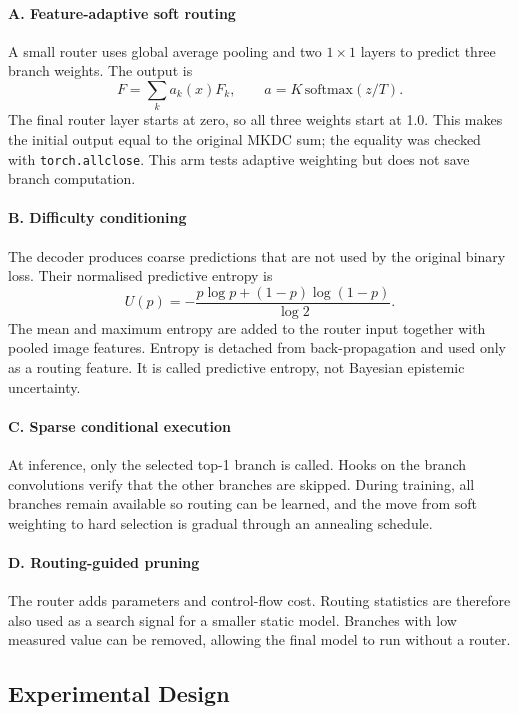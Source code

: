 \documentclass[10pt,a4paper]{article}
\begin{document}
\paragraph{A. Feature-adaptive soft routing} A small router uses global average pooling and two $1\times1$ layers to predict three branch weights. The output is
\[
F=\sum_k a_k(x)F_k, \qquad a=K\,\mathrm{softmax}(z/T).
\]
The final router layer starts at zero, so all three weights start at 1.0. This makes the initial output equal to the original MKDC sum; the equality was checked with \texttt{torch.allclose}. This arm tests adaptive weighting but does not save branch computation.

\paragraph{B. Difficulty conditioning} The decoder produces coarse predictions that are not used by the original binary loss. Their normalised predictive entropy is
\[
U(p)=-\frac{p\log p+(1-p)\log(1-p)}{\log 2}.
\]
The mean and maximum entropy are added to the router input together with pooled image features. Entropy is detached from back-propagation and used only as a routing feature. It is called predictive entropy, not Bayesian epistemic uncertainty.

\paragraph{C. Sparse conditional execution} At inference, only the selected top-1 branch is called. Hooks on the branch convolutions verify that the other branches are skipped. During training, all branches remain available so routing can be learned, and the move from soft weighting to hard selection is gradual through an annealing schedule.

\paragraph{D. Routing-guided pruning} The router adds parameters and control-flow cost. Routing statistics are therefore also used as a search signal for a smaller static model. Branches with low measured value can be removed, allowing the final model to run without a router.

\subsection{Experimental Design}
\end{document}
